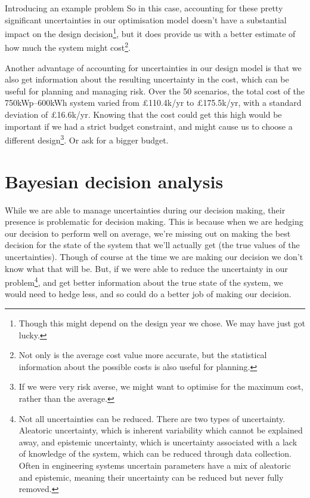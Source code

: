 \begin{ebox}[label=ebox:opt]{Introducing an example problem}
    So in this case, accounting for these pretty significant uncertainties in our optimisation model doesn't have a substantial impact on the design decision\footnote{Though this might depend on the design year we chose. We may have just got lucky.}, but it does provide us with a better estimate of how much the system might cost\footnote{Not only is the average cost value more accurate, but the statistical information about the possible costs is also useful for planning.}.

    Another advantage of accounting for uncertainties in our design model is that we also get information about the resulting uncertainty in the cost, which can be useful for planning and managing risk.
    Over the 50 scenarios, the total cost of the 750kWp--600kWh system varied from £110.4k/yr to £175.5k/yr, with a standard deviation of £16.6k/yr.
    Knowing that the cost could get this high would be important if we had a strict budget constraint, and might cause us to choose a different design\footnote{If we were very risk averse, we might want to optimise for the maximum cost, rather than the average.}. Or ask for a bigger budget.
\end{ebox}

\newpage
\section{Bayesian decision analysis} \label{sec:methodology-bayesian-decision-analysis}


While we are able to manage uncertainties during our decision making, their presence is problematic for decision making. This is because when we are hedging our decision to perform well on average, we're missing out on making the best decision for the state of the system that we'll actually get (the true values of the uncertainties). Though of course at the time we are making our decision we don't know what that will be. But, if we were able to reduce the uncertainty in our problem\footnote{Not all uncertainties can be reduced. There are two types of uncertainty. Aleatoric uncertainty, which is inherent variability which cannot be explained away, and epistemic uncertainty, which is uncertainty associated with a lack of knowledge of the system, which can be reduced through data collection. Often in engineering systems uncertain parameters have a mix of aleatoric and epistemic, meaning their uncertainty can be reduced but never fully removed.\label{fn:aleatoric}}, and get better information about the true state of the system, we would need to hedge less, and so could do a better job of making our decision.

